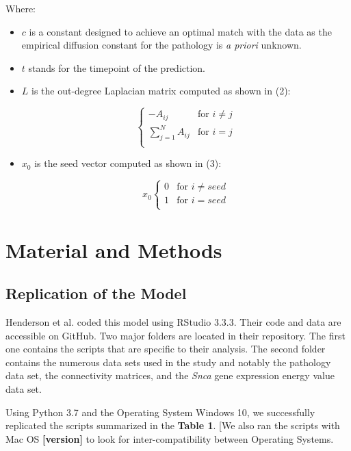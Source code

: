 Where:
\begin{itemize}
\item $c$ is a constant designed to achieve an optimal match with the data as the empirical diffusion constant for the pathology is \textit{a priori} unknown.
\item $t$ stands for the timepoint of the prediction. 
\item $L$ is the out-degree Laplacian matrix computed as shown in (2):

  \begin{equation}
    \begin{cases}
      -A_{ij} & \text{for $i \neq j$} \\
      \sum_{j=1}^N A_{ij} & \text{for $i=j$} \\
  \end{cases}
\end{equation}
\item  $x_{0}$ is the seed vector computed as shown in (3):
  
  \begin{equation}
    x_{0}
    \begin{cases}
        0 & \text{for $i \neq seed$} \\
        1 & \text{for $i = seed$} \\
    \end{cases}
  \end{equation}
\end{itemize}
   

\section{Material and Methods}
\subsection{Replication of the Model}
Henderson et al. coded this model using RStudio 3.3.3. Their code and data are accessible on GitHub. Two major folders are located in their repository. The first one contains the scripts that are specific to their analysis. The second folder contains the numerous data sets used in the study and notably the pathology data set, the connectivity matrices, and the \textit{Snca} gene expression energy value data set.


Using Python 3.7 and the Operating System Windows 10, we successfully replicated the scripts summarized in the \textbf{Table 1}. [We also ran the scripts with Mac OS\textbf{ [version] }to look for inter-compatibility between Operating Systems.

